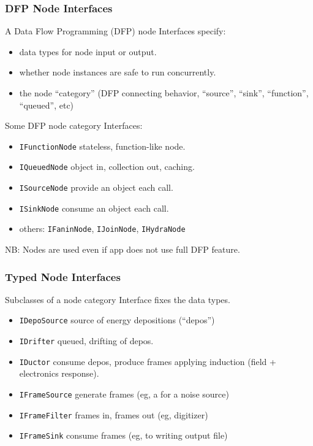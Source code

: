 \documentclass[xcolor=dvipsnames]{beamer}
\begin{document}
\begin{frame}
  \frametitle{DFP Node Interfaces}

  A Data Flow Programming (DFP) node Interfaces specify:
  \begin{itemize}\footnotesize
  \item data types for node input or output.
  \item whether node instances are safe to run concurrently.
  \item the node ``category'' (DFP connecting behavior, ``source'',
    ``sink'', ``function'', ``queued'', etc)
  \end{itemize}
  

  Some DFP node category Interfaces:
  \begin{itemize}\footnotesize
  \item \texttt{IFunctionNode} stateless, function-like node.
  \item \texttt{IQueuedNode} object in, collection out, caching.
  \item \texttt{ISourceNode} provide an object each call.
  \item \texttt{ISinkNode} consume an object each call.
  \item others: \texttt{IFaninNode}, \texttt{IJoinNode}, \texttt{IHydraNode}
  \end{itemize}

  \vfill
  \footnotesize NB: Nodes are used even if app does not use full DFP
  feature.
\end{frame}

\begin{frame}
  \frametitle{Typed Node Interfaces}
  Subclasses of a node category Interface fixes the data types.
  \begin{itemize}
  \item \texttt{IDepoSource} source of energy depositions (``depos'')
  \item \texttt{IDrifter} queued, drifting of depos.
  \item \texttt{IDuctor} consume depos, produce frames applying induction (field + electronics response).
  \item \texttt{IFrameSource} generate frames (eg, a for a noise source)
  \item \texttt{IFrameFilter} frames in, frames out (eg, digitizer)
  \item \texttt{IFrameSink} consume frames (eg, to writing output file)
  \end{itemize}
\end{frame}
\end{document}
